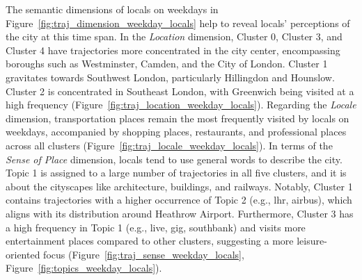\documentclass{article}
\theoremstyle{remark}
\begin{document}
The semantic dimensions of locals on weekdays in Figure~\ref{fig:traj_dimension_weekday_locals} help to reveal locals' perceptions of the city at this time span. In the \textit{Location} dimension, Cluster 0, Cluster 3, and Cluster 4 have trajectories more concentrated in the city center, encompassing boroughs such as Westminster, Camden, and the City of London. Cluster 1 gravitates towards Southwest London, particularly Hillingdon and Hounslow. Cluster 2 is concentrated in Southeast London, with Greenwich being visited at a high frequency (Figure~\ref{fig:traj_location_weekday_locals}). Regarding the \textit{Locale} dimension, transportation places remain the most frequently visited by locals on weekdays, accompanied by shopping places, restaurants, and professional places across all clusters (Figure~\ref{fig:traj_locale_weekday_locals}). In terms of the \textit{Sense of Place} dimension, locals tend to use general words to describe the city. Topic 1 is assigned to a large number of trajectories in all five clusters, and it is about the cityscapes like architecture, buildings, and railways. Notably, Cluster 1 contains trajectories with a higher occurrence of Topic 2 (e.g., lhr, airbus), which aligns with its distribution around Heathrow Airport. Furthermore, Cluster 3 has a high frequency in Topic 1 (e.g., live, gig, southbank) and visits more entertainment places compared to other clusters, suggesting a more leisure-oriented focus (Figure~\ref{fig:traj_sense_weekday_locals}, Figure~\ref{fig:topics_weekday_locals}).
\end{document}
